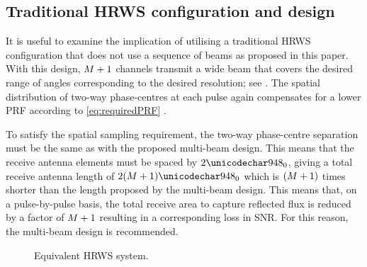 \subsection{Traditional HRWS configuration and design}
It is useful to examine the implication of utilising a traditional HRWS configuration that does not use a sequence of beams as proposed in this paper. With this design, $M + 1$ channels transmit a wide beam that covers the desired range of angles corresponding to the desired resolution; see . The spatial distribution of two-way phase-centres at each pulse again compensates for a lower PRF according to \eqref{eq:requiredPRF} \cite{GebertPHD}.
\par
To satisfy the spatial sampling requirement, the two-way phase-centre separation must be the same as with the proposed multi-beam design. This means that the receive antenna elements must be spaced by $2\resxDesired$, giving a total receive antenna length of $2(\channelM + 1)\resxDesired$ which is $(M + 1)$ times shorter than the length proposed by the multi-beam design. This means that, on a pulse-by-pulse basis, the total receive area to capture reflected flux is reduced by a factor of $M + 1$ resulting in a corresponding loss in SNR. For this reason, the multi-beam design is recommended.
\begin{figure}[h!]
\begin{center}
 \resizebox{0.7\columnwidth}{!}{}
 \caption{Equivalent HRWS system.}
 \label{fg:equivHRWS}
 \end{center}
\end{figure}
